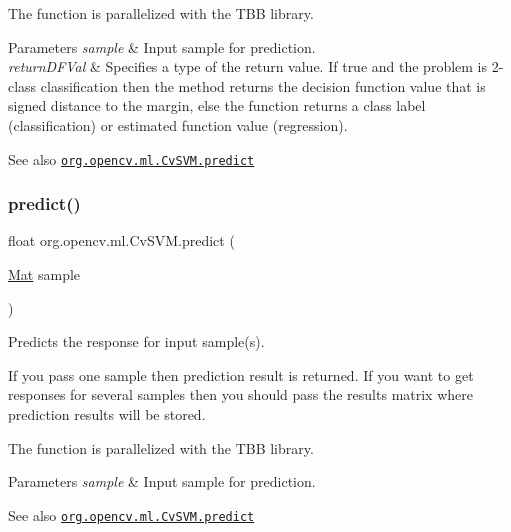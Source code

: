 The function is parallelized with the T\+BB library.


\begin{DoxyParams}{Parameters}
{\em sample} & Input sample for prediction. \\
\hline
{\em return\+D\+F\+Val} & Specifies a type of the return value. If {\ttfamily true} and the problem is 2-\/class classification then the method returns the decision function value that is signed distance to the margin, else the function returns a class label (classification) or estimated function value (regression).\\
\hline
\end{DoxyParams}
\begin{DoxySeeAlso}{See also}
\href{http://docs.opencv.org/modules/ml/doc/support_vector_machines.html#cvsvm-predict}{\tt org.\+opencv.\+ml.\+Cv\+S\+V\+M.\+predict} 
\end{DoxySeeAlso}
\mbox{\label{classorg_1_1opencv_1_1ml_1_1_cv_s_v_m_a92ce14aadb47b185792052fe7075a260}} 
\subsubsection{\texorpdfstring{predict()}{predict()}\hspace{0.1cm}{\footnotesize\ttfamily [2/2]}}
{\footnotesize\ttfamily float org.\+opencv.\+ml.\+Cv\+S\+V\+M.\+predict (\begin{DoxyParamCaption}\item[{\mbox{\hyperlink{classorg_1_1opencv_1_1core_1_1_mat}{Mat}}}]{sample }\end{DoxyParamCaption})}

Predicts the response for input sample(s).

If you pass one sample then prediction result is returned. If you want to get responses for several samples then you should pass the {\ttfamily results} matrix where prediction results will be stored.

The function is parallelized with the T\+BB library.


\begin{DoxyParams}{Parameters}
{\em sample} & Input sample for prediction.\\
\hline
\end{DoxyParams}
\begin{DoxySeeAlso}{See also}
\href{http://docs.opencv.org/modules/ml/doc/support_vector_machines.html#cvsvm-predict}{\tt org.\+opencv.\+ml.\+Cv\+S\+V\+M.\+predict} 
\end{DoxySeeAlso}
\mbox{\label{classorg_1_1opencv_1_1ml_1_1_cv_s_v_m_a17f89e26cf9aba5794fd55d20348a453}} 
